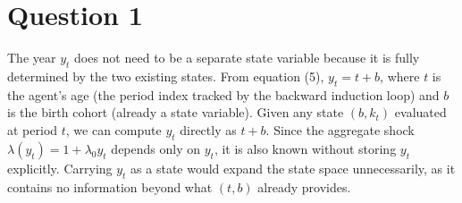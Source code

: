 \section*{Question 1}

The year $y_t$ does not need to be a separate state variable because it is fully determined by the two existing states. From equation (5), $y_t = t + b$, where $t$ is the agent's age (the period index tracked by the backward induction loop) and $b$ is the birth cohort (already a state variable). Given any state $(b, k_t)$ evaluated at period $t$, we can compute $y_t$ directly as $t + b$. Since the aggregate shock $\lambda(y_t) = 1 + \lambda_0 y_t$ depends only on $y_t$, it is also known without storing $y_t$ explicitly. Carrying $y_t$ as a state would expand the state space unnecessarily, as it contains no information beyond what $(t, b)$ already provides.

